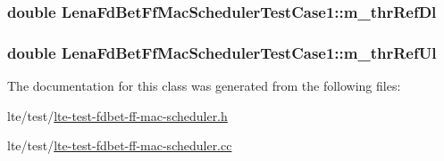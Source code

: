 \subsubsection[{\texorpdfstring{m\+\_\+thr\+Ref\+Dl}{m_thrRefDl}}]{\setlength{\rightskip}{0pt plus 5cm}double Lena\+Fd\+Bet\+Ff\+Mac\+Scheduler\+Test\+Case1\+::m\+\_\+thr\+Ref\+Dl\hspace{0.3cm}{\ttfamily [private]}}\hypertarget{classLenaFdBetFfMacSchedulerTestCase1_afad3bb9427ae1928c9983b91c9790fb7}{}\label{classLenaFdBetFfMacSchedulerTestCase1_afad3bb9427ae1928c9983b91c9790fb7}
\subsubsection[{\texorpdfstring{m\+\_\+thr\+Ref\+Ul}{m_thrRefUl}}]{\setlength{\rightskip}{0pt plus 5cm}double Lena\+Fd\+Bet\+Ff\+Mac\+Scheduler\+Test\+Case1\+::m\+\_\+thr\+Ref\+Ul\hspace{0.3cm}{\ttfamily [private]}}\hypertarget{classLenaFdBetFfMacSchedulerTestCase1_a758a3c328b35f8aadaffecddc45e3a40}{}\label{classLenaFdBetFfMacSchedulerTestCase1_a758a3c328b35f8aadaffecddc45e3a40}


The documentation for this class was generated from the following files\+:\begin{DoxyCompactItemize}
\item 
lte/test/\hyperlink{lte-test-fdbet-ff-mac-scheduler_8h}{lte-\/test-\/fdbet-\/ff-\/mac-\/scheduler.\+h}\item 
lte/test/\hyperlink{lte-test-fdbet-ff-mac-scheduler_8cc}{lte-\/test-\/fdbet-\/ff-\/mac-\/scheduler.\+cc}\end{DoxyCompactItemize}
